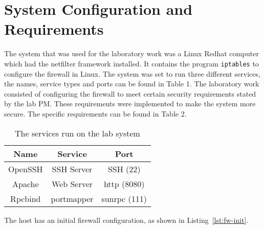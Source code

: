 \section{System Configuration and Requirements}
\label{sec:setup}
The system that was used for the laboratory work was a Linux Redhat computer which had the netfilter framework installed. It contains the program \verb;iptables; to configure the firewall in Linux. The system was set to run three different services, the names, service types and ports can be found in Table 1. The laboratory work consisted of configuring the firewall to meet certain security requirements stated by the lab PM. These requirements were implemented to make the system more secure. The specific requirements can be found in Table 2.

\begin{table}[h]
\centering
	\begin{tabular}{| c | c | c |}
	\hline
	 Name & Service & Port \\ \hline
	 OpenSSH & SSH Server & SSH (22) \\
	 Apache & Web Server & http (8080) \\
	 Rpcbind & portmapper & sunrpc (111) \\ 
	\hline
	\end{tabular}
	\caption{The services run on the lab system}
	\label{Service table}
\end{table}


The host has an initial firewall configuration, as shown in 
Listing~\ref{lst:fw-init}.



